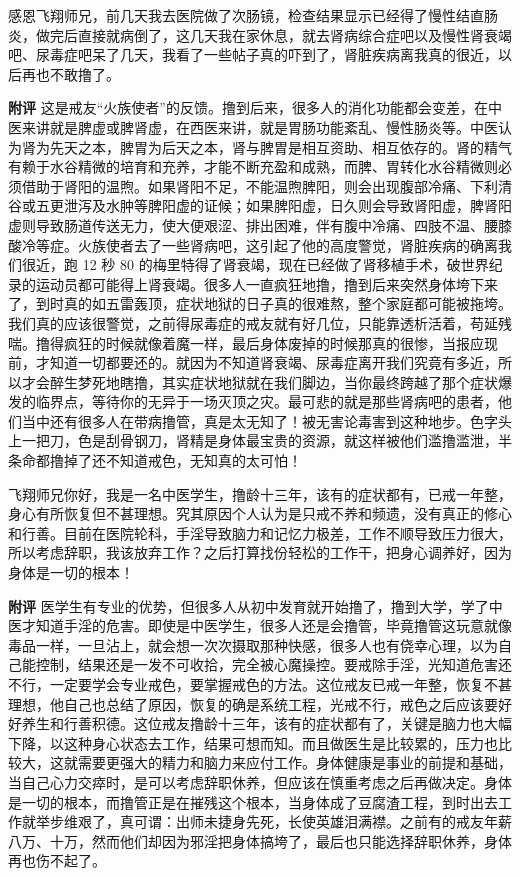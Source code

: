 \begin{case}
    感恩飞翔师兄，前几天我去医院做了次肠镜，检查结果显示已经得了慢性结直肠炎，做完后直接就病倒了，这几天我在家休息，就去肾病综合症吧以及慢性肾衰竭吧、尿毒症吧呆了几天，我看了一些帖子真的吓到了，肾脏疾病离我真的很近，以后再也不敢撸了。

    \textbf{附评} 这是戒友“火族使者”的反馈。撸到后来，很多人的消化功能都会变差，在中医来讲就是脾虚或脾肾虚，在西医来讲，就是胃肠功能紊乱、慢性肠炎等。中医认为肾为先天之本，脾胃为后天之本，肾与脾胃是相互资助、相互依存的。肾的精气有赖于水谷精微的培育和充养，才能不断充盈和成熟，而脾、胃转化水谷精微则必须借助于肾阳的温煦。如果肾阳不足，不能温煦脾阳，则会出现腹部冷痛、下利清谷或五更泄泻及水肿等脾阳虚的证候；如果脾阳虚，日久则会导致肾阳虚，脾肾阳虚则导致肠道传送无力，使大便艰涩、排出困难，伴有腹中冷痛、四肢不温、腰膝酸冷等症。火族使者去了一些肾病吧，这引起了他的高度警觉，肾脏疾病的确离我们很近，跑 12 秒 80 的梅里特得了肾衰竭，现在已经做了肾移植手术，破世界纪录的运动员都可能得上肾衰竭。很多人一直疯狂地撸，撸到后来突然身体垮下来了，到时真的如五雷轰顶，症状地狱的日子真的很难熬，整个家庭都可能被拖垮。我们真的应该很警觉，之前得尿毒症的戒友就有好几位，只能靠透析活着，苟延残喘。撸得疯狂的时候就像着魔一样，最后身体废掉的时候那真的很惨，当报应现前，才知道一切都要还的。就因为不知道肾衰竭、尿毒症离开我们究竟有多近，所以才会醉生梦死地瞎撸，其实症状地狱就在我们脚边，当你最终跨越了那个症状爆发的临界点，等待你的无异于一场灭顶之灾。最可悲的就是那些肾病吧的患者，他们当中还有很多人在带病撸管，真是太无知了！被无害论毒害到这种地步。色字头上一把刀，色是刮骨钢刀，肾精是身体最宝贵的资源，就这样被他们滥撸滥泄，半条命都撸掉了还不知道戒色，无知真的太可怕！
\end{case}

\begin{case}
    飞翔师兄你好，我是一名中医学生，撸龄十三年，该有的症状都有，已戒一年整，身心有所恢复但不甚理想。究其原因个人认为是只戒不养和频遗，没有真正的修心和行善。目前在医院轮科，手淫导致脑力和记忆力极差，工作不顺导致压力很大，所以考虑辞职，我该放弃工作？之后打算找份轻松的工作干，把身心调养好，因为身体是一切的根本！

    \textbf{附评} 医学生有专业的优势，但很多人从初中发育就开始撸了，撸到大学，学了中医才知道手淫的危害。即使是中医学生，很多人还是会撸管，毕竟撸管这玩意就像毒品一样，一旦沾上，就会想一次次摄取那种快感，很多人也有侥幸心理，以为自己能控制，结果还是一发不可收拾，完全被心魔操控。要戒除手淫，光知道危害还不行，一定要学会专业戒色，要掌握戒色的方法。这位戒友已戒一年整，恢复不甚理想，他自己也总结了原因，恢复的确是系统工程，光戒不行，戒色之后应该要好好养生和行善积德。这位戒友撸龄十三年，该有的症状都有了，关键是脑力也大幅下降，以这种身心状态去工作，结果可想而知。而且做医生是比较累的，压力也比较大，这就需要更强大的精力和脑力来应付工作。身体健康是事业的前提和基础，当自己心力交瘁时，是可以考虑辞职休养，但应该在慎重考虑之后再做决定。身体是一切的根本，而撸管正是在摧残这个根本，当身体成了豆腐渣工程，到时出去工作就举步维艰了，真可谓：出师未捷身先死，长使英雄泪满襟。之前有的戒友年薪八万、十万，然而他们却因为邪淫把身体搞垮了，最后也只能选择辞职休养，身体再也伤不起了。
\end{case}

